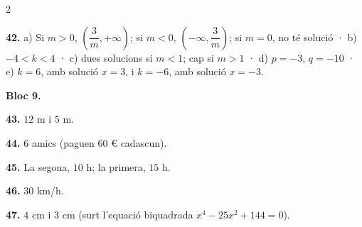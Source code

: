 \documentclass[13pt,a4paper]{extarticle}
\begin{document}
\begin{multicols}{2}
\begin{minipage}{\linewidth}
\end{minipage}\par\vspace{1.6mm}
\par\noindent\begin{minipage}{\linewidth}
\textbf{42.} a) Si $m>0$, $\left(\dfrac3m,+\infty\right)$; si $m<0$, $\left(-\infty,\dfrac3m\right)$; si $m=0$, no té solució · b) $-4<k<4$ · c) dues solucions si $m<1$; cap si $m>1$ · d) $p=-3$, $q=-10$ · e) $k=6$, amb solució $x=3$, i $k=-6$, amb solució $x=-3$.\par
\end{minipage}\par\vspace{1.6mm}
\textbf{Bloc 9.}\par
\par\noindent\begin{minipage}{\linewidth}
\textbf{43.} $12$ m i $5$ m.\par
\end{minipage}\par\vspace{1.6mm}
\par\noindent\begin{minipage}{\linewidth}
\textbf{44.} $6$ amics (paguen $60$ € cadascun).\par
\end{minipage}\par\vspace{1.6mm}
\par\noindent\begin{minipage}{\linewidth}
\textbf{45.} La segona, $10$ h; la primera, $15$ h.\par
\end{minipage}\par\vspace{1.6mm}
\par\noindent\begin{minipage}{\linewidth}
\textbf{46.} $30$ km/h.\par
\end{minipage}\par\vspace{1.6mm}
\par\noindent\begin{minipage}{\linewidth}
\textbf{47.} $4$ cm i $3$ cm (surt l'equació biquadrada $x^4-25x^2+144=0$).\par
\end{minipage}\par\vspace{1.6mm}

\end{multicols}
\end{document}
